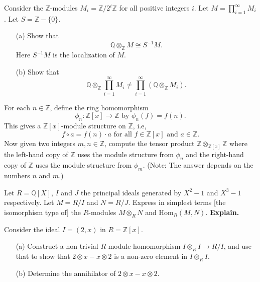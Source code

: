 \begin{prob}[S2009-Q5]
    Consider the \(\mathbb{Z}\)-modules \(M_i = \mathbb{Z}/2^i\mathbb{Z}\) for all positive integers \(i\). Let \(M = \prod_{i=1}^{\infty} M_i\). Let \(S = \mathbb{Z} - \{0\}\).
    \begin{itemize}
        \item[(a)] Show that
        \[\mathbb{Q} \otimes_{\mathbb{Z}} M \cong S^{-1}M.\]
        Here \(S^{-1}M\) is the localization of \(M\).
        \item[(b)] Show that
        \[\mathbb{Q} \otimes_{\mathbb{Z}} \prod_{i=1}^{\infty} M_i \neq \prod_{i=1}^{\infty} (\mathbb{Q} \otimes_{\mathbb{Z}} M_i).\]
    \end{itemize}
\end{prob}



\begin{prob}[F2008-Q5]
    For each \(n \in \mathbb{Z}\), define the ring homomorphism
    \[\phi_n : \mathbb{Z}[x] \to \mathbb{Z} \text{ by } \phi_n(f) = f(n).\]
    This gives a \(\mathbb{Z}[x]\)-module structure on \(\mathbb{Z}\), i.e,
    \[f \circ a = f(n) \cdot a \text{ for all } f \in \mathbb{Z}[x] \text{ and } a \in \mathbb{Z}.\]
    Now given two integers \(m,n \in \mathbb{Z}\), compute the tensor product \(\mathbb{Z} \otimes_{\mathbb{Z}[x]} \mathbb{Z}\) where the left-hand copy of \(\mathbb{Z}\) uses the module structure from \(\phi_n\) and the right-hand copy of \(\mathbb{Z}\) uses the module structure from \(\phi_m\). (Note: The answer depends on the numbers \(n\) and \(m\).)
\end{prob}


\begin{prob}[F2014-Q2]
    Let \(R = \mathbb{Q}[X]\), \(I\) and \(J\) the principal ideals generated by \(X^2 - 1\) and \(X^3 - 1\) respectively. Let \(M = R/I\) and \(N = R/J\). Express in simplest terms [the isomorphism type of] the \(R\)-modules \(M \otimes_R N\) and \(\text{Hom}_R(M, N)\). \textbf{Explain.}
\end{prob}


\begin{prob}[F2004-Q5]
    Consider the ideal \(I = (2,x)\) in \(R = \mathbb{Z}[x]\).
    \begin{itemize}
        \item[(a)] Construct a non-trivial \(R\)-module homomorphism \(I \otimes_R I \to R/I\), and use that to show that \(2 \otimes x - x \otimes 2\) is a non-zero element in \(I \otimes_R I\).
        \item[(b)] Determine the annihilator of \(2 \otimes x - x \otimes 2\).
    \end{itemize}
\end{prob}


